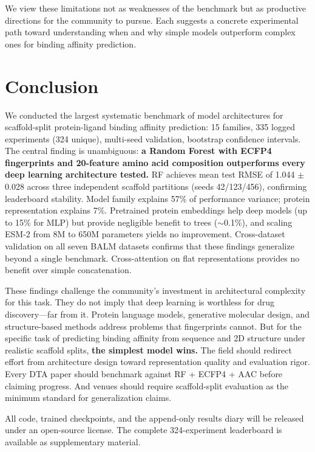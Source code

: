 \documentclass[11pt,twocolumn,a4paper]{article}
\begin{document}
We view these limitations not as weaknesses of the benchmark but as productive directions for the community to pursue. Each suggests a concrete experimental path toward understanding when and why simple models outperform complex ones for binding affinity prediction.

\section{Conclusion}

We conducted the largest systematic benchmark of model architectures for scaffold-split protein-ligand binding affinity prediction: 15 families, 335 logged experiments (324 unique), multi-seed validation, bootstrap confidence intervals. The central finding is unambiguous: \textbf{a Random Forest with ECFP4 fingerprints and 20-feature amino acid composition outperforms every deep learning architecture tested.} RF achieves mean test RMSE of 1.044 $\pm$ 0.028 across three independent scaffold partitions (seeds 42/123/456), confirming leaderboard stability. Model family explains 57\% of performance variance; protein representation explains 7\%. Pretrained protein embeddings help deep models (up to 15\% for MLP) but provide negligible benefit to trees ($\sim$0.1\%), and scaling ESM-2 from 8M to 650M parameters yields no improvement. Cross-dataset validation on all seven BALM datasets confirms that these findings generalize beyond a single benchmark. Cross-attention on flat representations provides no benefit over simple concatenation.

These findings challenge the community's investment in architectural complexity for this task. They do not imply that deep learning is worthless for drug discovery---far from it. Protein language models, generative molecular design, and structure-based methods address problems that fingerprints cannot. But for the specific task of predicting binding affinity from sequence and 2D structure under realistic scaffold splits, \textbf{the simplest model wins.} The field should redirect effort from architecture design toward representation quality and evaluation rigor. Every DTA paper should benchmark against RF + ECFP4 + AAC before claiming progress. And venues should require scaffold-split evaluation as the minimum standard for generalization claims.

All code, trained checkpoints, and the append-only results diary will be released under an open-source license. The complete 324-experiment leaderboard is available as supplementary material.
\end{document}
